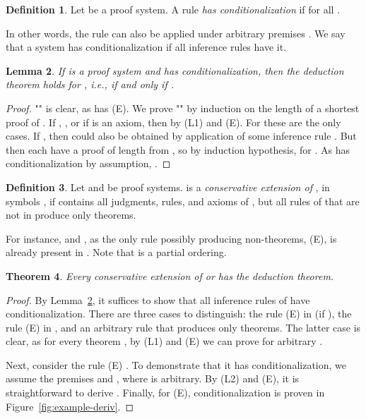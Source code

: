 \documentclass[a4paper,english,fleqn,11pt,final]{scrartcl}
\makeatletter
\newcommand{\ie}{i.e.\@\xspace}
\newcommand{\Deriv}[1]{{\normalfont\textsf{#1}}}
\theoremstyle{plain}
\newtheorem{theorem}{Theorem}[section]
\newtheorem{lemma}[theorem]{Lemma}
\theoremstyle{definition}
\newtheorem{definition}[theorem]{Definition}
\makeatother
\begin{document}
\begin{definition}
Let  be a proof system. A rule  \emph{has conditionalization} if  for all .
\end{definition}

In other words, the rule can also be applied under arbitrary premises .
We say that a system  has conditionalization if all inference rules have it.

\begin{lemma}\label{lem:deduction-theorem}
If  is a proof system and  has conditionalization, then the deduction theorem holds for , \ie,  if and only if .
\end{lemma}

\begin{proof}
"" is clear, as  has \Deriv{(E)}.
We prove "" by induction on the length  of a shortest proof of .
If , , or if  is an axiom, then  by \Deriv{(L1)} and \Deriv{(E)}.
For  these are the only cases.
If , then  could also be obtained by application of some inference rule .
But then  each have a proof of length  from , so by induction hypothesis,  for .
As  has conditionalization by assumption, .
\end{proof}


\begin{definition}
Let  and  be proof systems.
 is a \emph{conservative extension of} , in symbols , if  contains all judgments, rules, and axioms of , but all rules of  that are not in  produce only theorems.
\end{definition}

For instance,  and , as the only rule possibly producing non-theorems, \Deriv{(E)}, is already present in .
Note that  is a partial ordering.



\begin{theorem}\label{thm:ext-deduction}
Every conservative extension  of  or  has the deduction theorem.
\end{theorem}
\begin{proof}
By Lemma~\ref{lem:deduction-theorem}, it suffices to show that all inference rules of  have conditionalization.
There are three cases to distinguish:
the rule \Deriv{(E)} in  (if ), the rule \Deriv{(E)} in , and an arbitrary rule that produces only theorems.
The latter case is clear, as for every theorem , by \Deriv{(L1)} and \Deriv{(E)} we can prove  for arbitrary .

Next, consider the rule \Deriv{(E)} .
To demonstrate that it has conditionalization, we assume the premises  and , where  is arbitrary.
By \Deriv{(L2)} and \Deriv{(E)}, it is straightforward to derive .
Finally, for \Deriv{(E)}, conditionalization is proven in Figure~\ref{fig:example-deriv}.
\end{proof}
\end{document}
